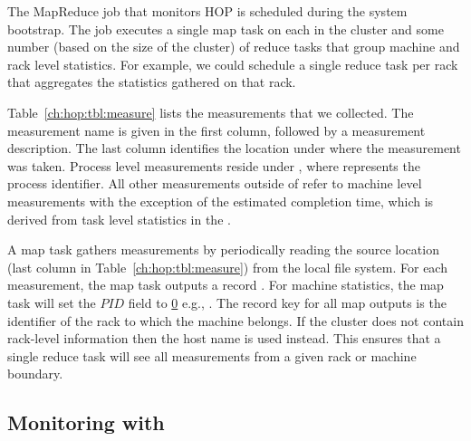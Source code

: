 The MapReduce job that monitors HOP is scheduled during the system bootstrap.
The job executes a single map task on each \TT in the cluster and some
number (based on the size of the cluster) of reduce tasks that group machine
and rack level statistics.  For example, we could schedule a single reduce task
per rack that aggregates the statistics gathered on that rack.

Table~\ref{ch:hop:tbl:measure} lists the measurements that we collected.  The
measurement name is given in the first column, followed by a measurement
description.  The last column identifies the location under  where
the measurement was taken.  Process level measurements reside under
, where \ol{[pid]} represents the process identifier.  All
other measurements outside of  refer to machine level
measurements with the exception of the estimated completion time, which is
derived from task level statistics in the \JT.

A map task gathers measurements by periodically reading the source location
(last column in Table~\ref{ch:hop:tbl:measure}) from the local file system.
For each measurement, the map task outputs a record .  For machine statistics, the map
task will set the $PID$ field to {\underline 0} e.g.,
.  The
record key for all map outputs is the identifier of the rack to which the
machine belongs.  If the cluster does not contain rack-level information then
the host name is used instead.  This ensures that a single reduce task will see
all measurements from a given rack or machine boundary.

\subsection{Monitoring with \OVERLOG}
\label{ch:hop:sec:omonitor}

